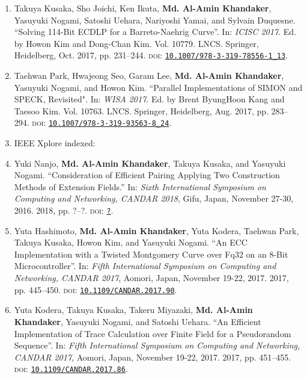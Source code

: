 \begin{itemize}
\begin{enumerate}
	\item Takuya Kusaka, Sho Joichi, Ken Ikuta, \textbf{Md. Al-Amin Khandaker}, \\ Yasuyuki Nogami, Satoshi Uehara, Nariyoshi Yamai, and Sylvain Duquesne. ``Solving 114-Bit ECDLP for a Barreto-Naehrig Curve''. In: \textit{ICISC 2017}. Ed. by Howon Kim and Dong-Chan Kim. Vol. 10779. LNCS. Springer, Heidelberg, Oct. 2017, pp. 231–244. \textsc{doi}: \href{https://doi.org/10.1007/978-3-319-78556-1_13}{\texttt{10.1007/978-3-319-78556-1\_13}}.
	
	\item  Taehwan Park, Hwajeong Seo, Garam Lee,\textbf{ Md. Al-Amin Khandaker}, \\Yasuyuki Nogami, and Howon Kim. ``Parallel Implementations of SIMON and SPECK, Revisited". In: \textit{WISA 2017}. Ed. by Brent ByungHoon Kang and Taesoo Kim. Vol. 10763. LNCS. Springer, Heidelberg, Aug. 2017, pp. 283–294. \textsc{doi}: \href{https://doi.org/10.1007/978-3-319-93563-8_24}{\texttt{10.1007/978-3-319-93563-8\_24}}.  
	
		\vspace{5mm}
	\item[ ] \Large IEEE Xplore indexed:
	\normalsize
	
		\item Yuki Nanjo, \textbf{Md. Al-Amin Khandaker}, Takuya Kusaka, and Yasuyuki Nogami. ``Consideration of Efficient Pairing Applying Two Construction Methods of Extension Fields.'' In:  \textit{Sixth International Symposium on Computing and Networking, CANDAR 2018}, Gifu, Japan, November 27-30, 2016. 2018, pp. ?–?. \textsc{doi}: \href{_}{\texttt{?}}.

	
	\item Yuta Hashimoto, \textbf{Md. Al-Amin Khandaker}, Yuta Kodera, Taehwan Park, Takuya Kusaka, Howon Kim, and Yasuyuki Nogami. ``An ECC Implementation with a Twisted Montgomery Curve over Fq32 on an 8-Bit Microcontroller''. In: \textit{Fifth International Symposium on Computing and Networking, CANDAR 2017}, Aomori, Japan, November 19-22, 2017. 2017, pp. 445–450. \textsc{doi}: \href{https://doi.org/10.1109/CANDAR.2017.90}{\texttt{10.1109/CANDAR.2017.90}}.
	

   \item	Yuta Kodera, Takuya Kusaka, Takeru Miyazaki, \textbf{Md. Al-Amin Khandaker}, Yasuyuki Nogami, and Satoshi Uehara. ``An Efficient Implementation of Trace Calculation over Finite Field for a Pseudorandom Sequence''. In: \textit{Fifth International Symposium on Computing and Networking, CANDAR 2017}, Aomori, Japan, November 19-22, 2017. 2017, pp. 451–455. \textsc{doi}: \href{https://doi.org/10.1109/CANDAR.2017.86}{\texttt{10.1109/CANDAR.2017.86}}.
   

\end{enumerate}
\end{itemize}
